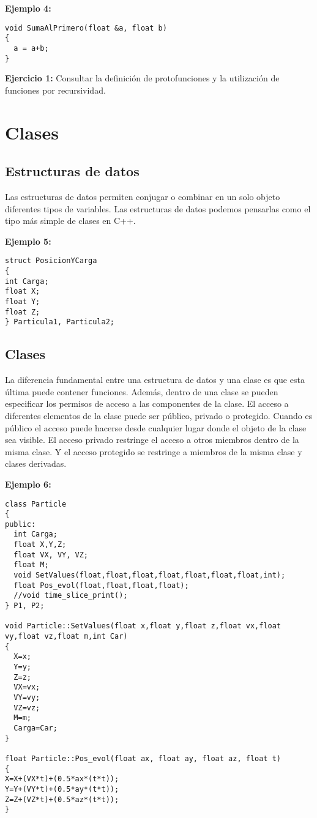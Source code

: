 \documentclass[10.5pt]{article}
\begin{document}
{\bf Ejemplo 4:}
\begin{verbatim}
void SumaAlPrimero(float &a, float b) 
{
  a = a+b;
}
\end{verbatim}

{\bf Ejercicio 1:} Consultar la definición de protofunciones y la utilización de funciones por recursividad.

\section{Clases}
\subsection{Estructuras de datos}

Las estructuras de datos permiten conjugar o combinar en un solo objeto diferentes tipos de variables. Las estructuras de datos podemos pensarlas como el tipo más simple de clases en C++.

{\bf Ejemplo 5:}
\begin{verbatim}
struct PosicionYCarga
{
int Carga;
float X;
float Y;
float Z;
} Particula1, Particula2;
\end{verbatim}

\subsection{Clases}

La diferencia fundamental entre una estructura de datos y una clase es que esta última puede contener funciones. Además, dentro de una clase se pueden especificar los permisos de acceso a las componentes de la clase. El acceso a diferentes elementos de la clase puede ser público, privado o protegido. Cuando es público el acceso puede hacerse desde cualquier lugar donde el objeto de la clase sea visible. El acceso privado restringe el acceso a otros miembros dentro de la misma clase. Y el acceso protegido se restringe a miembros de la misma clase y clases derivadas.

{\bf Ejemplo 6:}
\begin{verbatim}
class Particle
{
public:
  int Carga;
  float X,Y,Z;
  float VX, VY, VZ;
  float M;
  void SetValues(float,float,float,float,float,float,float,int);
  float Pos_evol(float,float,float,float);
  //void time_slice_print();
} P1, P2;

void Particle::SetValues(float x,float y,float z,float vx,float vy,float vz,float m,int Car)
{
  X=x;
  Y=y;
  Z=z;
  VX=vx;
  VY=vy;
  VZ=vz;
  M=m;
  Carga=Car;
}

float Particle::Pos_evol(float ax, float ay, float az, float t)
{
X=X+(VX*t)+(0.5*ax*(t*t));
Y=Y+(VY*t)+(0.5*ay*(t*t));
Z=Z+(VZ*t)+(0.5*az*(t*t));
}
\end{verbatim}
\end{document}
